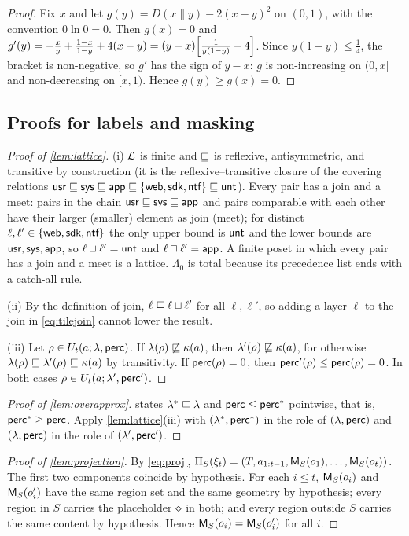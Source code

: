 \begin{proof}
Fix $x$ and let $g(y)=D(x\|y)-2(x-y)^2$ on $(0,1)$, with the convention $0\ln 0=0$. Then $g(x)=0$ and $g'(y)=-\frac{x}{y}+\frac{1-x}{1-y}+4(x-y)=(y-x)\Bigl[\frac{1}{y(1-y)}-4\Bigr]$. Since $y(1-y)\le\frac14$, the bracket is non-negative, so $g'$ has the sign of $y-x$: $g$ is non-increasing on $(0,x]$ and non-decreasing on $[x,1)$. Hence $g(y)\ge g(x)=0$.
\end{proof}

\subsection{Proofs for labels and masking}

\begin{proof}[Proof of \cref{lem:lattice}]
(i) $\mathcal{L}$ is finite and $\sqsubseteq$ is reflexive, antisymmetric, and transitive by construction (it is the reflexive--transitive closure of the covering relations $\textsf{usr}\sqsubseteq\textsf{sys}\sqsubseteq\textsf{app}\sqsubseteq\{\textsf{web},\textsf{sdk},\textsf{ntf}\}\sqsubseteq\textsf{unt}$). Every pair has a join and a meet: pairs in the chain $\textsf{usr}\sqsubseteq\textsf{sys}\sqsubseteq\textsf{app}$ and pairs comparable with each other have their larger (smaller) element as join (meet); for distinct $\ell,\ell'\in\{\textsf{web},\textsf{sdk},\textsf{ntf}\}$ the only upper bound is $\textsf{unt}$ and the lower bounds are $\textsf{usr},\textsf{sys},\textsf{app}$, so $\ell\sqcup\ell'=\textsf{unt}$ and $\ell\sqcap\ell'=\textsf{app}$. A finite poset in which every pair has a join and a meet is a lattice. $\Lambda_0$ is total because its precedence list ends with a catch-all rule.

(ii) By the definition of join, $\ell\sqsubseteq\ell\sqcup\ell'$ for all $\ell,\ell'$, so adding a layer $\ell$ to the join in \cref{eq:tilejoin} cannot lower the result.

(iii) Let $\rho\in U_t(a;\lambda,\mathsf{perc})$. If $\lambda(\rho)\not\sqsubseteq\kappa(a)$, then $\lambda'(\rho)\not\sqsubseteq\kappa(a)$, for otherwise $\lambda(\rho)\sqsubseteq\lambda'(\rho)\sqsubseteq\kappa(a)$ by transitivity. If $\mathsf{perc}(\rho)=0$, then $\mathsf{perc}'(\rho)\le\mathsf{perc}(\rho)=0$. In both cases $\rho\in U_t(a;\lambda',\mathsf{perc}')$.
\end{proof}

\begin{proof}[Proof of \cref{lem:overapprox}]
 states $\lambda^*\sqsubseteq\lambda$ and $\mathsf{perc}\le\mathsf{perc}^*$ pointwise, that is, $\mathsf{perc}^*\ge\mathsf{perc}$. Apply \cref{lem:lattice}(iii) with $(\lambda^*,\mathsf{perc}^*)$ in the role of $(\lambda,\mathsf{perc})$ and $(\lambda,\mathsf{perc})$ in the role of $(\lambda',\mathsf{perc}')$.
\end{proof}

\begin{proof}[Proof of \cref{lem:projection}]
By \cref{eq:proj}, $\Pi_S(\xi_t)=(T,a_{1:t-1},\mathsf{M}_S(o_1),\dots,\mathsf{M}_S(o_t))$. The first two components coincide by hypothesis. For each $i\le t$, $\mathsf{M}_S(o_i)$ and $\mathsf{M}_S(o'_i)$ have the same region set and the same geometry by hypothesis; every region in $S$ carries the placeholder $\diamond$ in both; and every region outside $S$ carries the same content by hypothesis. Hence $\mathsf{M}_S(o_i)=\mathsf{M}_S(o'_i)$ for all $i$.
\end{proof}


